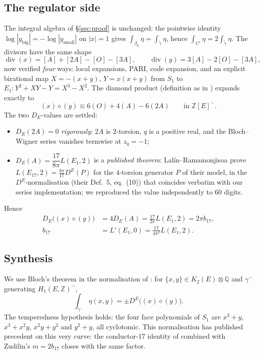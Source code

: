 \documentclass[preprint,12pt]{elsarticle}
\theoremstyle{definition}
\theoremstyle{remark}
\newcommand{\Q}{\mathbb{Q}}
\newcommand{\Z}{\mathbb{Z}}
\DeclareMathOperator{\divisor}{div}
\begin{document}
\subsection{The regulator side}

The integral algebra of \S\ref{sec:proof} is unchanged: the pointwise
identity $\log|y_{\mathrm{big}}|=-\log|y_{\mathrm{small}}|$ on $|x|=1$ gives
$\int_{\beta_0}\eta=\int_{\tilde\gamma}\eta$, hence
$\int_{C'}\eta=2\int_{\tilde\gamma}\eta$. The divisors have the same shape
\[
  \divisor(x)=[A]+[2A]-[O]-[3A],\qquad
  \divisor(y)=3[A]-2[O]-[3A],
\]
now verified \emph{four} ways: local expansions, PARI, code expansion, and an
explicit birational map $X=-(x+y)$, $Y=x(x+y)$ from $S_1$ to
$E_1:Y^2+XY-Y=X^3-X^2$. The diamond product (definition as in \cite{LSZ})
expands exactly to
\[
  (x)\diamond(y)\equiv 6(O)+4(A)-6(2A)\qquad\text{in }\Z[E]^-.
\]
The two $D_E$-values are settled:
\begin{itemize}
  \item $D_E(2A)=0$ \emph{rigorously}: $2A$ is $2$-torsion, $q$ is a positive
  real, and the Bloch--Wigner series vanishes termwise at $z_q=-1$;
  \item $D_E(A)=\dfrac{17}{8\pi}L(E_1,2)$ is a \emph{published theorem}:
  Lal\'in--Ramamonjisoa \cite[\S5]{LalinRam} prove
  $L(E_{17},2)=\frac{8\pi}{17}D^E(P)$ for the $4$-torsion generator $P$ of
  their model, in the $D^E$-normalisation (their Def.~5, eq.~(10)) that
  coincides verbatim with our series implementation; we reproduced the value
  independently to $60$ digits.
\end{itemize}
Hence
\[
\begin{aligned}
  D_E\big((x)\diamond(y)\big)&=4D_E(A)=\frac{17}{2\pi}L(E_1,2)=2\pi b_{17},\\
  b_{17}&=L'(E_1,0)=\frac{17}{4\pi^2}L(E_1,2).
\end{aligned}
\]

\subsection{Synthesis}

We use Bloch's theorem in the normalisation of \cite[Thm.~6]{LalinRam}: for
$\{x,y\}\in K_2(E)\otimes\Q$ and $\gamma^-$ generating $H_1(E,\Z)^-$,
\[
  \int_{\gamma^-}\eta(x,y)=\pm D^E\big((x)\diamond(y)\big).
\]
The temperedness hypothesis holds: the four face polynomials of $S_1$ are
$x^3+y$, $x^3+x^2y$, $x^2y+y^2$ and $y^2+y$, all cyclotomic. This
normalisation has published precedent on this very
curve: the conductor-$17$ identity of \cite{LalinRam} combined with
Zudilin's $m=2b_{17}$ closes with the same factor.
\end{document}
